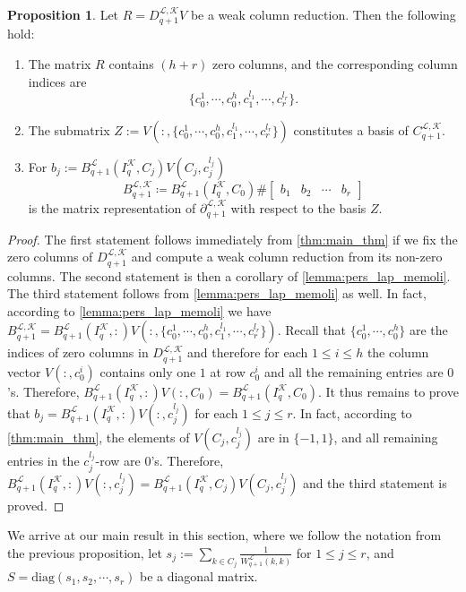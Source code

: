 \documentclass{article}
\theoremstyle{definition}
\newtheorem{proposition}[theorem]{Proposition}
\newcommand{\diag}{\mathrm{diag}}
\newcommand{\KK}{\mathcal{K}}
\newcommand{\LL}{\mathcal{L}}
\begin{document}
\begin{proposition}\label{prop:pers_lap}
Let $R=D_{q+1}^{\LL,\KK}V$ be a weak column reduction.
Then the following hold:
\begin{enumerate}
    \item The matrix $R$ contains $(h+r)$ zero columns,
    and the corresponding column indices are 
    \[\{c_0^1, \cdots, c_0^h, c_1^{l_1},\cdots, c_r^{l_r}\}.\]
    \item The submatrix $Z:=V(:, \{c_0^1, \cdots, c_0^h, c_1^{l_1},\cdots, c_r^{l_r}\})$ constitutes a basis of $C_{q+1}^{\LL, \KK}$.
    \item For 
    $b_j:= B_{q+1}^\LL(I_q^\KK, C_j)V(C_j, c_j^{l_j})$ \[B_{q+1}^{\LL, \KK}
    \coloneqq 
    B_{q+1}^\LL(I_q^{\KK}, C_0) \#
    \begin{bmatrix}
    b_1 & b_2 & \cdots & b_r
    \end{bmatrix}
    \]
    is the matrix representation of $\partial_{q+1}^{\LL, \KK}$ with respect to the basis $Z$.
\end{enumerate}
\end{proposition}
\begin{proof}
    The first statement follows immediately from  \cref{thm:main_thm} if we fix the zero columns of $D_{q+1}^{\LL, \KK}$ and compute a weak column reduction from its non-zero columns. The second statement is then a corollary of  \cref{lemma:pers_lap_memoli}.
    The third statement follows from \cref{lemma:pers_lap_memoli} as well.
    In fact, according to \cref{lemma:pers_lap_memoli} we have 
    $B_{q+1}^{\LL, \KK}=B_{q+1}^\LL(I_q^\KK, :)V\left(:, \{c_0^1,\cdots, c_0^{h}, c_1^{l_1}, \cdots, c_r^{l_r}\}\right)$.
    Recall that $\{c_0^1,\cdots, c_0^h\}$ are the indices of zero columns in $D_{q+1}^{\LL, \KK}$ and therefore for each $1\leq i \leq h$ the column vector $V\left(:, c_0^i\right)$ contains only one $1$ at row $c_0^i$ and all the remaining entries are $0$'s.
    Therefore,
    $B_{q+1}^\LL(I_q^\KK, :)V\left(:, C_0\right)=B_{q+1}^\LL(I_q^{\KK}, C_0)$.
    It thus remains to prove that $b_j=B_{q+1}^\LL(I_q^\KK, :)V(:, c_j^{l_j})$ for each $1\leq j\leq r$.
    In fact,
    according to  \cref{thm:main_thm}, the elements of $V(C_j, c_j^{l_j})$ are in $\{-1, 1\}$, and all remaining entries in the $c_j^{l_j}$-row are $0$'s. Therefore,  $B_{q+1}^\LL(I_q^\KK, :)V(:, c_j^{l_j})=B_{q+1}^\LL(I_q^\KK, C_j)V(C_j, c_j^{l_j})$ and the third statement is proved.
\end{proof}
We arrive at our main result in this section, where we follow the notation from the previous proposition, let $s_j:=\sum\limits_{k\in C_j}\frac{1}{W_{q+1}^\LL(k, k)}$ for $1\leq j\leq r$, and $S=\diag(s_1, s_2,\cdots, s_r)$ be a diagonal matrix.
\end{document}
